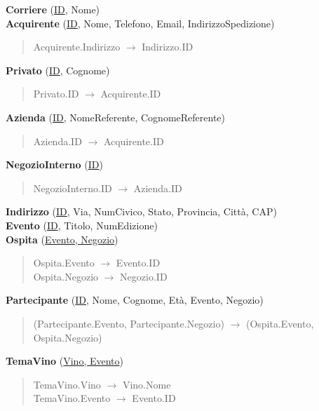 \textbf{Corriere} (\underline{ID}, Nome)\\
\textbf{Acquirente} (\underline{ID}, Nome, Telefono, Email, IndirizzoSpedizione)
\begin{verse}
	Acquirente.Indirizzo $\to$ Indirizzo.ID
\end{verse} 
\textbf{Privato} (\underline{ID}, Cognome)
\begin{verse}
	Privato.ID $\to$ Acquirente.ID
\end{verse} 
\textbf{Azienda} (\underline{ID}, NomeReferente, CognomeReferente)
\begin{verse}
	Azienda.ID $\to$ Acquirente.ID
\end{verse} 
\textbf{NegozioInterno} (\underline{ID})
\begin{verse}
	NegozioInterno.ID $\to$ Azienda.ID
\end{verse} 
\textbf{Indirizzo} (\underline{ID}, Via, NumCivico, Stato, Provincia, Città, CAP)\\
\textbf{Evento} (\underline{ID}, Titolo, NumEdizione)\\
\textbf{Ospita} (\underline{Evento, Negozio})
\begin{verse}
	Ospita.Evento $\to$ Evento.ID\\
	Ospita.Negozio $\to$ Negozio.ID
\end{verse} 
\textbf{Partecipante} (\underline{ID}, Nome, Cognome, Età, Evento, Negozio)
\begin{verse}
	(Partecipante.Evento, Partecipante.Negozio) $\to$ (Ospita.Evento, Ospita.Negozio)
\end{verse} 
\textbf{TemaVino} (\underline{Vino, Evento})
\begin{verse}
	TemaVino.Vino $\to$ Vino.Nome\\
	TemaVino.Evento $\to$ Evento.ID
\end{verse} 